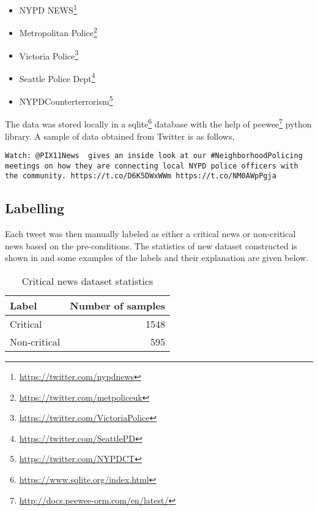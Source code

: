 \begin{itemize}
    \item NYPD NEWS\footnote{\url{https://twitter.com/nypdnews}}
    \item Metropolitan Police\footnote{\url{https://twitter.com/metpoliceuk}}
    \item Victoria Police\footnote{\url{https://twitter.com/VictoriaPolice}}
    \item Seattle Police Dept\footnote{\url{https://twitter.com/SeattlePD}}
    \item NYPDCounterterrorism\footnote{\url{https://twitter.com/NYPDCT}}
\end{itemize}

The data was stored locally in a sqlite\footnote{\url{https://www.sqlite.org/index.html}} database with the help of peewee\footnote{\url{http://docs.peewee-orm.com/en/latest/}} python library. A sample of data obtained from Twitter is as follows,

\begin{verbatim}
Watch: @PIX11News  gives an inside look at our #NeighborhoodPolicing
meetings on how they are connecting local NYPD police officers with
the community. https://t.co/D6K5DWxWWm https://t.co/NM0AWpPgja
\end{verbatim}

\subsection{Labelling}
Each tweet was then manually labeled as either a critical news or non-critical news based on the pre-conditions. The statistics of new dataset constructed is shown in   and some examples of the labels and their explanation are given below.

\begin{table}[h]
\begin{center}
\caption{Critical news dataset statistics}
\label{tbl:dataset_statistics}
\begin{tabular}{lr}
\toprule 
Label&Number of samples\\
\midrule 
Critical&1548\\
Non-critical&595\\
\bottomrule
\end{tabular}
\end{center}
\end{table}


